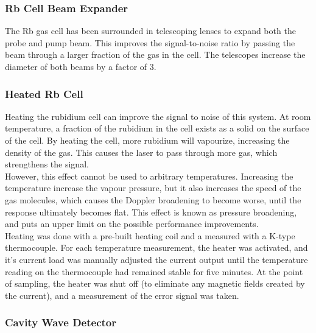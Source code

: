    \subsubsection{Rb Cell Beam Expander}

The Rb gas cell has been surrounded in telescoping lenses to expand both the probe and pump beam.  This improves the signal-to-noise ratio by passing the beam through a larger fraction of the gas in the cell.  The telescopes increase the diameter of both beams by a factor of 3. \\

    \subsubsection{Heated Rb Cell}

Heating the rubidium cell can improve the signal to noise of this system.  At room temperature, a fraction of the rubidium in the cell exists as a solid on the surface of the cell.  By heating the cell, more rubidium will vapourize, increasing the density of the gas.  This causes the laser to pass through more gas, which strengthens the signal. \\

However, this effect cannot be used to arbitrary temperatures.  Increasing the temperature increase the vapour pressure, but it also increases the speed of the gas molecules, which causes the Doppler broadening to become worse, until the response ultimately becomes flat.  This effect is known as pressure broadening, and puts an upper limit on the possible performance improvements. \\

Heating was done with a pre-built heating coil and a measured with a K-type thermocouple.  For each temperature measurement, the heater was activated, and it's current load was manually adjusted the current output until the temperature reading on the thermocouple had remained stable for five minutes.  At the point of sampling, the heater was shut off (to eliminate any magnetic fields created by the current), and a measurement of the error signal was taken. \\

    \subsubsection{Cavity Wave Detector}

